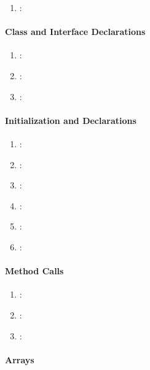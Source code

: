 \begin{enumerate} [resume]
	\item \emph{\checkX}:
\end{enumerate}

\paragraph{Class and Interface Declarations} %
\label{par:class_and_interface_declarations}

\begin{enumerate} [resume]
	\item \emph{\checkY}:
	\item \emph{\checkZ}:
	\item \emph{\checkAA}:
\end{enumerate}

\paragraph{Initialization and Declarations} %
\label{par:initialization_and_declarations}

\begin{enumerate} [resume]
	\item \emph{\checkAB}:
	\item \emph{\checkAC}:
	\item \emph{\checkAD}:
	\item \emph{\checkAE}:
	\item \emph{\checkAF}:
	\item \emph{\checkAG}:
\end{enumerate}

\paragraph{Method Calls} %
\label{par:method_calls}

\begin{enumerate} [resume]
	\item \emph{\checkAH}:
	\item \emph{\checkAI}:
	\item \emph{\checkAJ}:
\end{enumerate}

\paragraph{Arrays} %
\label{par:arrays}

